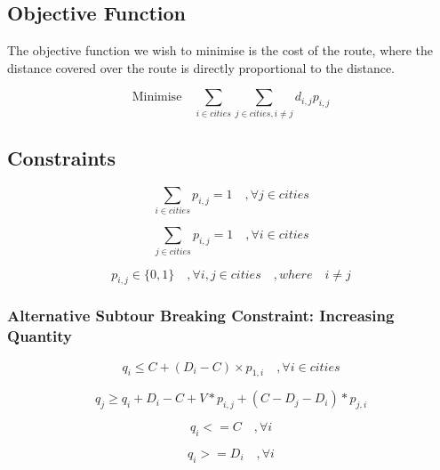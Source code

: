 \documentclass[a4paper,11pt]{article}
\begin{document}
\subsection{Objective Function}

The objective function we wish to minimise is the cost of the route, where the distance covered over the route is directly proportional to the distance. 

\begin{equation}\label{eq1}
\textrm{Minimise} \quad \sum\limits_{i \in cities} \sum\limits_{j \in cities, i \neq j} d_{i,j} p_{i,j}
\end{equation}

\subsection{Constraints}

\begin{equation}\label{eq2}
\sum\limits_{i \in cities} p_{i,j} = 1 \quad , \forall j \in cities
\end{equation}

\begin{equation}\label{eq3}
\sum\limits_{j \in cities} p_{i,j} = 1 \quad , \forall i \in cities
\end{equation}

\begin{equation}\label{eq4}
p_{i,j} \in{\{0,1\}} \quad , \forall i,j \in cities\quad, where \quad i \neq j
\end{equation}

\subsubsection{Alternative Subtour Breaking Constraint: Increasing Quantity }
\begin{equation}\label{Q}
q_{i} \leq C + (D_{i} - C) \times  p _{1,i} \quad, \forall i \in cities
\end{equation}

\begin{equation}\label{incQ}
q_{j} \geq q_{i} + D_{i} - C + V*p_{i,j}  + (C-D_{j}-D_{i})*p_{j,i}
\end{equation}

\begin{equation}
q_{i} <= C \quad, \forall i
\end{equation}

\begin{equation}
q_{i} >= D_{i} \quad, \forall i
\end{equation}
\end{document}
